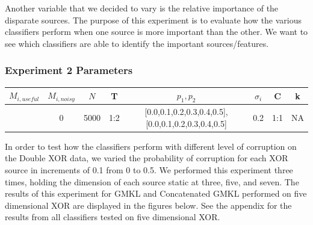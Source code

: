 \documentclass{article}
\begin{document}
Another variable that we decided to vary is the relative importance of the
disparate sources. The purpose of this experiment is to evaluate how the
various classifiers perform when one source is more important than the other.
We want to see which classifiers are able to identify the important
sources/features.

\subsubsection*{Experiment 2 Parameters}
\begin{center}
\begin{tabular}{|c|c|c|c|c|c|c|c|}
\hline
$M_{i,useful}$ & $M_{i, noisy}$ & $N$ & T &  $p_1, p_2$ & $\sigma_i$ & C &  k  \\
\hline
[3,5,7] & 0 & 5000 & 1:2 & [0.0,0.1,0.2,0.3,0.4,0.5],[0.0,0.1,0.2,0.3,0.4,0.5] & 0.2 & 1:1 & NA  \\
\hline
\end{tabular}
\end{center}



In order to test how the classifiers perform with different level of corruption
on the Double XOR data, we varied the probability of corruption for each XOR
source in increments of 0.1 from 0 to 0.5. We performed this experiment three
times, holding the dimension of each source static at three, five, and seven.
The results of this experiment for GMKL and Concatenated GMKL performed on
five dimensional XOR are displayed in the figures below. See the appendix for
the results from all classifiers tested on five dimensional XOR.
\end{document}
